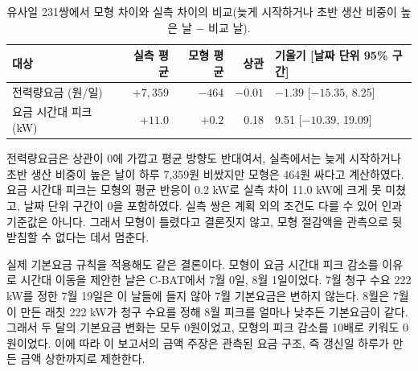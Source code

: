 \begin{table}[htbp]
\centering
\hwptablefont
\setlength{\tabcolsep}{4pt}
\caption{유사일 231쌍에서 모형 차이와 실측 차이의 비교(늦게 시작하거나 초반 생산 비중이 높은 날 $-$ 비교 날).}\label{tab:ch4-counter}
\begin{tabular}{lrrrl}
\toprule
대상 & 실측 평균 & 모형 평균 & 상관 & 기울기 [날짜 단위 95\% 구간] \\
\midrule
전력량요금 (원/일) & $+7{,}359$ & $-464$ & $-0.01$ & $-1.39$ [$-15.35$, 8.25] \\
요금 시간대 피크 (kW) & $+11.0$ & $+0.2$ & 0.18 & 9.51 [$-10.39$, 19.09] \\
\bottomrule
\end{tabular}
\end{table}

전력량요금은 상관이 0에 가깝고 평균 방향도 반대여서, 실측에서는 늦게 시작하거나 초반 생산 비중이 높은 날이 하루 7,359원 비쌌지만 모형은 464원 싸다고 계산하였다. 요금 시간대 피크는 모형의 평균 반응이 0.2 kW로 실측 차이 11.0 kW에 크게 못 미쳤고, 날짜 단위 구간이 0을 포함하였다. 실측 쌍은 계획 외의 조건도 다를 수 있어 인과 기준값은 아니다. 그래서 모형이 틀렸다고 결론짓지 않고, 모형 절감액을 관측으로 뒷받침할 수 없다는 데서 멈춘다.

실제 기본요금 규칙을 적용해도 같은 결론이다. 모형이 요금 시간대 피크 감소를 이유로 시간대 이동을 제안한 날은 C-BAT에서 7월 0일, 8월 1일이었다. 7월 청구 수요 222 kW를 정한 7월 19일은 이 날들에 들지 않아 7월 기본요금은 변하지 않는다. 8월은 7월이 만든 래칫 222 kW가 청구 수요를 정해 8월 피크를 얼마나 낮추든 기본요금이 같다. 그래서 두 달의 기본요금 변화는 모두 0원이었고, 모형의 피크 감소를 10배로 키워도 0원이었다. 이에 따라 이 보고서의 금액 주장은 관측된 요금 구조, 즉 갱신일 하루가 만든 금액 상한까지로 제한한다.

